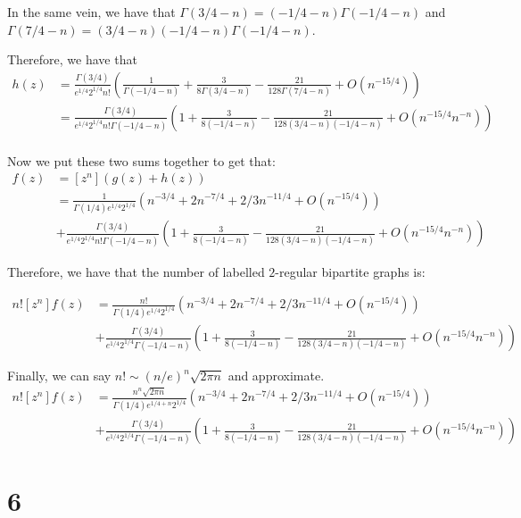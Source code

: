 \documentclass[]{article}
\begin{document}
In the same vein, we have that $\Gamma(3/4 - n) = (-1/4 - n)\Gamma(-1/4 - n)$ and $\Gamma(7/4 - n) = (3/4 - n)(-1/4 - n) \Gamma(-1/4 - n)$. 

Therefore, we have that
\begin{align*}
	[z^n] h(z) &= \frac{\Gamma(3/4)}{e^{1/4} 2^{1/4} n!} \left(\frac{1}{\Gamma(-1/4 - n)}+ \frac{3}{8 \Gamma(3/4 - n)} - \frac{21}{128 \Gamma(7/4 - n)}+  O(n^{-15/4})\right)\\
	&= 
	\frac{\Gamma(3/4)}{e^{1/4} 2^{1/4} n! \Gamma(-1/4 - n)} \left(1+ \frac{3}{8 (-1/4 - n)} - \frac{21}{128 (3/4 - n)(-1/4 - n)}+  O(n^{-15/4} n^{-n})\right)\\
\end{align*}

Now we put these two sums together to get that:
\begin{align*}
	[z^n] f(z) &= [z^n] \left(g(z) + h(z)\right)\\
	&=
	\frac{1}{\Gamma(1/4) e^{1/4} 2^{1/4} }\left( n^{-3/4} +  2 n^{-7/4} + 2/3 n^{-11/4} + O(n^{-15/4}) \right)\\ 
	&+
	\frac{\Gamma(3/4)}{e^{1/4} 2^{1/4} n! \Gamma(-1/4 - n)} \left(1+ \frac{3}{8 (-1/4 - n)} - \frac{21}{128 (3/4 - n)(-1/4 - n)}+  O(n^{-15/4} n^{-n})\right)
\end{align*}


Therefore, we have that the number of labelled $2$-regular bipartite graphs is:

\begin{align}
	n! [z^n] f(z)&=
\frac{n!}{\Gamma(1/4) e^{1/4} 2^{1/4}}\left( n^{-3/4} +  2 n^{-7/4} + 2/3 n^{-11/4} + O(n^{-15/4}) \right)\\ 
&+
\frac{\Gamma(3/4)}{e^{1/4} 2^{1/4} \Gamma(-1/4 - n)}  \left(1+ \frac{3}{8 (-1/4 - n)} - \frac{21}{128 (3/4 - n)(-1/4 - n)}+  O(n^{-15/4} n^{-n})\right)
\end{align}

Finally, we can say $n! \sim (n/e)^n\sqrt{2 \pi n}$ and approximate. 
\begin{align}
	n! [z^n] f(z)&=
	\frac{n^n \sqrt{2 \pi n}}{\Gamma(1/4) e^{1/4 + n} 2^{1/4}}\left( n^{-3/4} +  2 n^{-7/4} + 2/3 n^{-11/4} + O(n^{-15/4}) \right)\\ 
	&+
	\frac{\Gamma(3/4)}{e^{1/4} 2^{1/4} \Gamma(-1/4 - n)}  \left(1+ \frac{3}{8 (-1/4 - n)} - \frac{21}{128 (3/4 - n)(-1/4 - n)}+  O(n^{-15/4} n^{-n})\right)
\end{align}
\section{6}
\end{document}
